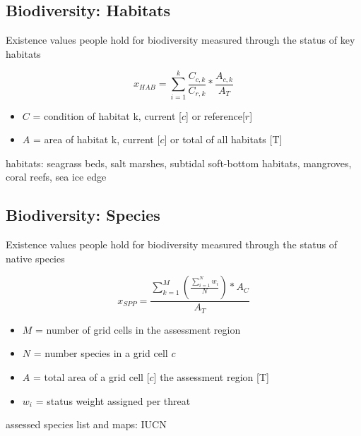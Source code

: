 \documentclass[
]{article}
\begin{document}
\hypertarget{biodiversity-habitats}{%
\subsection{Biodiversity: Habitats}\label{biodiversity-habitats}}

Existence values people hold for biodiversity measured through the
status of key habitats

\[
x_{HAB} =  \sum_{i=1}^{k} \frac{C_{c,k}}{C_{r,k}} * \frac{A_{c,k}}{A_{T}}
\]

\begin{itemize}
\item
  \(C\) = condition of habitat k, current {[}\(c\){]} or
  reference{[}\(r\){]}
\item
  \(A\) = area of habitat k, current {[}\(c\){]} or total of all
  habitats {[}T{]}
\end{itemize}

habitats: seagrass beds, salt marshes, subtidal soft-bottom habitats,
mangroves, coral reefs, sea ice edge

\hypertarget{biodiversity-species}{%
\subsection{Biodiversity: Species}\label{biodiversity-species}}

Existence values people hold for biodiversity measured through the
status of native species

\[
x_{SPP} = \frac{\sum_{k=1}^{M} (\frac{\sum_{i=1}^{N} w_{i}}{N}) * A_{C}}{A_{T}} 
\]

\begin{itemize}
\item
  \(M\) = number of grid cells in the assessment region
\item
  \(N\) = number species in a grid cell \(c\)
\item
  \(A\) = total area of a grid cell {[}\(c\){]} the assessment region
  {[}T{]}
\item
  \(w_{i}\) = status weight assigned per threat
\end{itemize}

assessed species list and maps: IUCN
\end{document}
